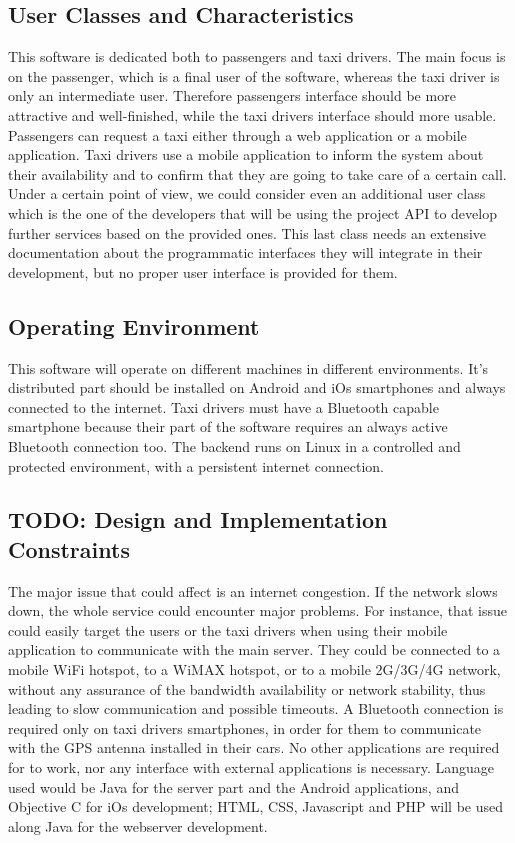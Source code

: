 \subsection{User Classes and Characteristics}
This software is dedicated both to passengers and taxi drivers. The main focus is on the passenger, which is a final user of the software, whereas the taxi driver is only an intermediate user. Therefore passengers interface should be more attractive and well-finished, while the taxi drivers interface should more usable.
Passengers can request a taxi either through a web application or a mobile application.
Taxi drivers use a mobile application to inform the system about their availability and to confirm that they are going to take care of a certain call.
Under a certain point of view, we could consider even an additional user class which is the one of the developers that will be using the project API to develop further services based on the provided ones.
This last class needs an extensive documentation about the programmatic interfaces they will integrate in their development, but no proper user interface is provided for them.
\subsection{Operating Environment}
This software will operate on different machines in different environments. It's distributed part should be installed on Android and iOs smartphones and always connected to the internet. Taxi drivers must have a Bluetooth capable smartphone because their part of the software requires an always active Bluetooth connection too.
The backend runs on Linux in a controlled and protected environment, with a persistent internet connection.
\subsection{TODO: Design and Implementation Constraints}
The major issue that could affect \myTaxiService{} is an internet congestion. If the network slows down, the whole service could encounter major problems.
For instance, that issue could easily target the users or the taxi drivers when using their mobile application to communicate with the main server.
They could be connected to a mobile WiFi hotspot, to a WiMAX hotspot, or to a mobile 2G/3G/4G network, without any assurance of the bandwidth availability or network stability, thus leading to slow communication and possible timeouts.
A Bluetooth connection is required only on taxi drivers smartphones, in order for them to communicate with the GPS antenna installed in their cars.
No other applications are required for \myTaxiService{} to work, nor any interface with external applications is necessary.
Language used would be Java for the server part and the Android applications, and Objective C for iOs development; HTML, CSS, Javascript and PHP will be used along Java for the webserver development.

